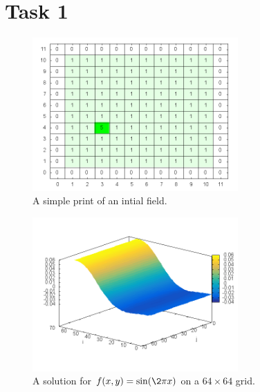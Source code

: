 

\section{Task 1}
  \begin{figure}[h!]
    \centering
      \includegraphics[width=0.7\textwidth]{plots/task_01.png}
    \caption{A simple print of an intial field.}
    \label{fig:task01}
  \end{figure}

  \begin{figure}[h!]
    \centering
      \includegraphics[width=0.7\textwidth]{plots/compute_result}
    \caption{A solution for $f(x,y) = \sin(\2\pi x)$ on a $64\times 64$ grid.}
    \label{fig:solution}
  \end{figure}

